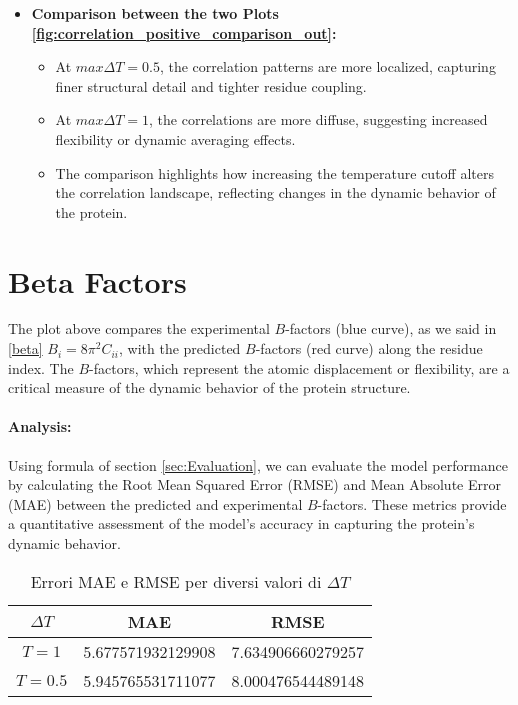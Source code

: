 \documentclass[English, Lau, oneside]{sapthesis}
\begin{document}
\begin{itemize}
    \item \textbf{Comparison between the two Plots \ref{fig:correlation_positive_comparison_out}:}
    \begin{itemize}
        \item At \(max \Delta T = 0.5\), the correlation patterns are more localized, capturing finer structural detail and tighter residue coupling.
        \item At \(max \Delta T = 1\), the correlations are more diffuse, suggesting increased flexibility or dynamic averaging effects.
        \item The comparison highlights how increasing the temperature cutoff alters the correlation landscape, reflecting changes in the dynamic behavior of the protein.
    \end{itemize}
\end{itemize}
\newpage
\newpage




\section{Beta Factors}
\noindent The plot above compares the experimental \( B \)-factors (blue curve), as we said in \eqref{beta} $B_i = 8\pi^2 C_{ii}$, with the predicted \( B \)-factors (red curve) along the residue index. The \( B \)-factors, which represent the atomic displacement or flexibility, are a critical measure of the dynamic behavior of the protein structure.
\paragraph{Analysis:}

Using formula of section \ref{sec:Evaluation}, we can evaluate the model performance by calculating the Root Mean Squared Error (RMSE) and Mean Absolute Error (MAE) between the predicted and experimental \( B \)-factors. 
These metrics provide a quantitative assessment of the model's accuracy in capturing the protein's dynamic behavior.
\begin{table}[ht]
    \centering
    \begin{tabular}{|c|c|c|}
        \hline
        $\Delta T$ & MAE & RMSE \\ \hline
        $T=1$ & 5.677571932129908 & 7.634906660279257 \\ \hline
        $T=0.5$ & 5.945765531711077 & 8.000476544489148 \\ \hline
    \end{tabular}
    \caption{Errori MAE e RMSE per diversi valori di $\Delta T$}
    \label{tab:mae_rmse}
\end{table}
\end{document}
